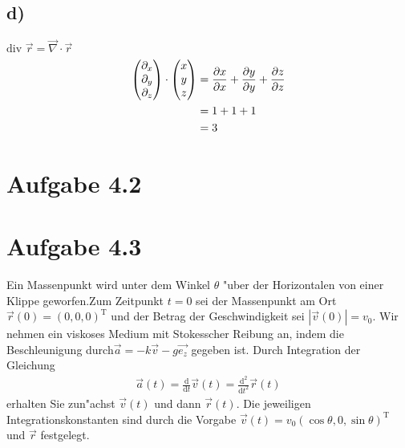 \documentclass{theozettel}
\begin{document}
\subsection*{d)}$\text{div }\vec{r}=\vec{\nabla}\cdot\vec{r}$
\begin{align*}
\mqty(\partial_x\\\partial_y\\\partial_z)\cdot\mqty(x\\y\\z)&=\frac{\partial x}{\partial x}+\frac{\partial y}{\partial y}+\frac{\partial z}{\partial z}\\
&=1+1+1\\
&=3
\end{align*}

\newpage
\section*{Aufgabe 4.2}


\newpage
\section*{Aufgabe 4.3}Ein Massenpunkt wird unter dem Winkel $\theta$ "uber der Horizontalen von einer Klippe geworfen.Zum Zeitpunkt $t= 0$ sei der Massenpunkt am Ort $\vec{r}\left(0\right) = \left(0,0,0\right)^\text{T}$ und der Betrag der Geschwindigkeit sei $\left|\vec{v}\left(0\right)\right|=v_0$. Wir nehmen ein viskoses Medium mit Stokesscher Reibung an, indem die Beschleunigung durch$\vec{a}=-k\vec{v}-g\vec{e_z}$ gegeben ist. Durch Integration der Gleichung
\begin{align*}
\vec{a}\left(t\right)=\frac{\text{d}}{\text{d}t}\vec{v}\left(t\right)=\frac{\text{d}^2}{\text{d}t^2}\vec{r}\left(t\right)
\end{align*}
erhalten Sie zun"achst $\vec{v}\left(t\right)$ und dann $\vec{r}\left(t\right)$. Die jeweiligen Integrationskonstanten sind durch die Vorgabe  $\vec{v}\left(t\right)= v_0\left(\cos \theta,0,\sin\theta\right)^\text{T}$ und $\vec{r}$ festgelegt.
\end{document}
